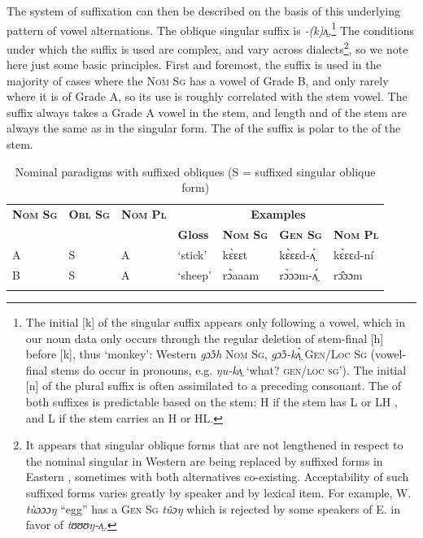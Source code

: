\documentclass[output=paper,newtxmath,modfonts,nonflat]{langsci/langscibook}
\begin{document}
The system of suffixation can then be described on the basis of this underlying pattern of vowel alternations. The oblique singular suffix is \textit{{}-(k)}\textit{ʌ̤}.\footnote{The initial [k] of the singular suffix appears only following a vowel, which in our noun data only occurs through the regular deletion of stem-final [h] before [k], thus ‘monkey’: Western  \textit{gɔ̂ɔh} \textsc{Nom Sg}, \textit{gɔ̂ɔ-kʌ̤̀} \textsc{Gen/Loc Sg} (vowel-final stems do occur in pronouns, e.g. \textit{ŋu-kʌ̤} ‘what? \textsc{gen/loc sg}’). The initial [n] of the plural suffix is often assimilated to a preceding  consonant. The  of both suffixes is predictable based on the stem: H if the stem has L or LH , and L if the stem carries an H or HL.} The conditions under which the suffix is used are complex, and vary across dialects\footnote{It appears that singular oblique forms that are not lengthened in respect to the nominal singular in Western  are being replaced by suffixed forms in Eastern , sometimes with both alternatives co-existing. Acceptability of such suffixed forms varies greatly by speaker and by lexical item. For example, W.   \textit{tùɔɔɔŋ}  “egg” has a \textsc{Gen Sg} \textit{tûɔŋ} which is rejected by some speakers of E.  in favor of \textit{tʊʊʊŋ-ʌ̤.}}, so we note here just some basic principles. First and foremost, the suffix is used in the majority of cases where the \textsc{Nom Sg} has a vowel of Grade B, and only rarely where it is of Grade A, so its use is roughly correlated with the stem vowel. The suffix always takes a Grade A vowel in the stem, and length and  of the stem are always the same as in the  singular form. The  of the suffix is polar to the  of the stem.

\begin{table}
\begin{tabularx}{\textwidth}{XXXXXXX}
\lsptoprule

\bfseries\scshape Nom Sg & \bfseries\scshape Obl Sg & \bfseries\scshape Nom Pl & \multicolumn{4}{c}{\bfseries Examples}\\
\cmidrule{4-7}
&  &  & \bfseries Gloss & \bfseries\scshape Nom Sg & \bfseries\scshape Gen Sg & \bfseries\scshape Nom Pl\\
\midrule
A & S & A & ‘stick’ & kɛ̀ɛɛt & kɛ̀ɛɛd-ʌ̤́ & kɛ̀ɛɛd-ní\\
B & S & A & ‘sheep’ & rɔ̀aaam & rɔ̀ɔɔm-ʌ̤́ & rɔ̂ɔɔm\\
\lspbottomrule
\end{tabularx}
\caption{Nominal paradigms with suffixed obliques  (S = suffixed singular oblique form)}
\label{tab:monich:18}
\end{table}
\end{document}
